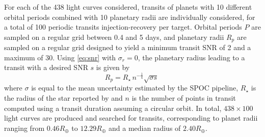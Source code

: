 \documentclass[modern,linenumbers]{aastex631}
\newcommand{\review}[1]{#1}
\begin{document}
For each \review{of the 438 light curves considered}, transits of planets with 10 different orbital periods combined with 10 planetary radii are individually considered, for a total of 100 periodic transits injection-recovery per target. Orbital periods $P$ are sampled on a regular grid between 0.4 and 5 days, and planetary radii $R_p$ are sampled on a regular grid designed to yield a minimum transit SNR of 2 and a maximum of 30. Using \autoref{eq:snr} with $\sigma_r = 0$, the planetary radius leading to a transit with a desired SNR $s$ is given by
\begin{equation*}
    R_p = R_{\star}\,n^{-\frac{1}{4}} \sqrt{\sigma s}\ %
\end{equation*}
where $\sigma$ is equal to the mean uncertainty estimated by the SPOC pipeline, $R_\star$ is the radius of the star reported by \cite{Ramsay2020} and $n$ is the number of points in transit computed using a transit duration assuming a circular orbit. \review{In total, $438 \times 100$ light curves are produced and searched for transits, corresponding to planet radii ranging from $0.46 R_\oplus$ to $12.29 R_\oplus$ and a median radius of $2.40 R_\oplus$.}\\\\
\end{document}
